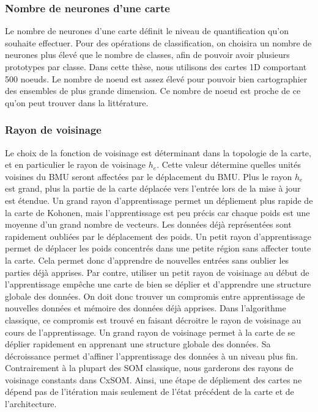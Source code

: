 \subsubsection{Nombre de neurones d'une carte}
Le nombre de neurones d'une carte définit le niveau de quantification qu'on souhaite effectuer. Pour des opérations de classification, on choisira un nombre de neurones plus élevé que le nombre de classes, afin de pouvoir avoir plusieurs prototypes par classe.
Dans cette thèse, nous utilisons des cartes 1D comportant 500 noeuds. Le nombre de noeud est assez élevé pour pouvoir bien cartographier des ensembles de plus grande dimension. Ce nombre de noeud est proche de ce qu'on peut trouver dans la littérature.

\subsubsection{Rayon de voisinage}
Le choix de la fonction de voisinage est déterminant dans la topologie de la carte, et en particulier le rayon de voisinage $h_e$.
Cette valeur détermine quelles unités voisines du BMU seront affectées par le déplacement du BMU.
Plus le rayon $h_e$ est grand, plus la partie de la carte déplacée vers l'entrée lors de la mise à jour est étendue. Un grand rayon d'apprentissage permet un dépliement plus rapide de la carte de Kohonen, mais l'apprentissage est peu précis car chaque poids est une moyenne d'un grand nombre de vecteurs. Les données déjà représentées sont rapidement oubliées par le déplacement des poids.
Un petit rayon d'apprentissage permet de déplacer les poids concentrés dans une petite région sans affecter toute la carte. Cela permet donc d'apprendre de nouvelles entrées sans oublier les parties déjà apprises. Par contre, utiliser un petit rayon de voisinage au début de l'apprentissage empêche une carte de bien se déplier et d'apprendre une structure globale des données. On doit donc trouver un compromis entre apprentissage de nouvelles données et mémoire des données déjà apprises.
Dans l'algorithme classique, ce compromis est trouvé en faisant décroitre le rayon de voisinage au cours de l'apprentissage. Un grand rayon de voisinage permet à la carte de se déplier rapidement en apprenant une structure globale des données. Sa décroissance permet d'affiner l'apprentissage des données à un niveau plus fin. 
Contrairement à la plupart des SOM classique, nous garderons des rayons de voisinage constants dans CxSOM. Ainsi, une étape de dépliement des cartes ne dépend pas de l'itération mais seulement de l'état précédent de la carte et de l'architecture.
